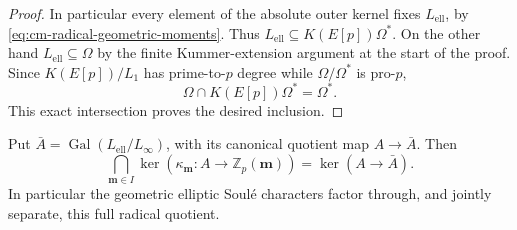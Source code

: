 \begin{proof}
In particular every element of the absolute outer kernel fixes
\(L_{\mathrm{ell}}\), by
\eqref{eq:cm-radical-geometric-moments}.
Thus \(L_{\mathrm{ell}}\subseteq K(E[p])\Omega^*\).
On the other hand \(L_{\mathrm{ell}}\subseteq\Omega\) by the
finite Kummer-extension argument at the start of the proof.
Since \(K(E[p])/L_1\) has prime-to-\(p\) degree while
\(\Omega/\Omega^*\) is pro-\(p\),
\[
                 \Omega\cap K(E[p])\Omega^*=\Omega^*.
\]
This exact intersection proves the desired inclusion.
\end{proof}

\begin{corollary}\label{cor:cm-radical-joint-kernel}
Put \(\bar A=\operatorname{Gal}(L_{\mathrm{ell}}/L_\infty)\),
with its canonical quotient map \(A\to\bar A\).
Then
\[
 \bigcap_{\boldsymbol m\in I}\ker
       (\kappa_{\boldsymbol m}:A\longrightarrow
                           \mathbb Z_p(\boldsymbol m))
                         =\ker(A\longrightarrow\bar A).
\]
In particular the geometric elliptic Soul\'e characters factor
through, and jointly separate, this full radical quotient.
\end{corollary}

